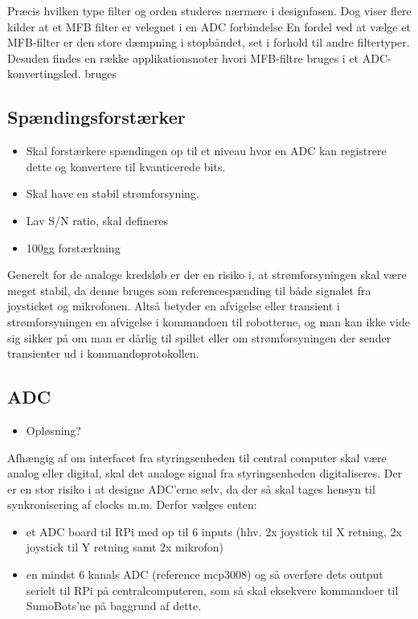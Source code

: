 Præcis hvilken type filter og orden studeres nærmere i designfasen. Dog viser flere kilder at et MFB filter er velegnet i en ADC forbindelse \cite[s.~413]{Horowitz2015}
En fordel ved at vælge et MFB-filter er den store dæmpning i stopbåndet, set i forhold til andre filtertyper\cite{ADCMFBTI}. Desuden findes en række applikationsnoter hvori MFB-filtre bruges i et ADC-konvertingsled. bruges\cite{OPA344Data}\tbr
{}
\subsection{Spændingsforstærker}
\begin{itemize}
    \item Skal forstærkere spændingen op til et niveau hvor en ADC kan registrere dette og konvertere til kvanticerede bits.
    \item Skal have en stabil strømforsyning.
    \item Lav S/N ratio, \tbr skal defineres
    \item 100gg forstærkning \tbr
\end{itemize}
Generelt for de analoge kredsløb er der en risiko i, at strømforsyningen skal være meget stabil, da denne bruges som referencespænding til både signalet fra joysticket og mikrofonen. Altså betyder en afvigelse eller transient i strømforsyningen en afvigelse i kommandoen til robotterne, og man kan ikke vide sig sikker på om man er dårlig til spillet eller om strømforsyningen der sender transienter ud i kommandoprotokollen. 


\subsection{ADC}
\begin{itemize}
    \item \tbr Opløsning?
\end{itemize}
\tbr Afhængig af om interfacet fra styringsenheden til central computer skal være analog eller digital, skal det analoge signal fra styringsenheden digitaliseres. 
Der er en stor risiko i at designe ADC'erne selv, da der så skal tages hensyn til synkronisering af clocks m.m. Derfor vælges enten:
\begin{itemize}
    \item et ADC board til RPi med op til 6 inputs (hhv. 2x joystick til X retning, 2x joystick til Y retning samt 2x mikrofon)
    \item en mindst 6 kanals ADC (reference mcp3008) og så overføre dets output serielt til RPi på centralcomputeren, som så skal eksekvere kommandoer til SumoBots'ne på baggrund af dette. 
\end{itemize}

